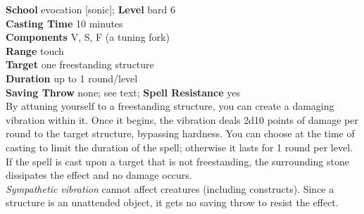 \textbf{School} evocation [sonic]; \textbf{Level} bard 6\\
\textbf{Casting Time} 10 minutes\\
\textbf{Components} V, S, F (a tuning fork)\\
\textbf{Range} touch\\
\textbf{Target} one freestanding structure\\
\textbf{Duration} up to 1 round/level\\
\textbf{Saving Throw} none; see text; \textbf{Spell Resistance} yes\\
By attuning yourself to a freestanding structure, you can create a damaging vibration within it. Once it begins, the vibration deals 2d10 points of damage per round to the target structure, bypassing hardness. You can choose at the time of casting to limit the duration of the spell; otherwise it lasts for 1 round per level. If the spell is cast upon a target that is not freestanding, the surrounding stone dissipates the effect and no damage occurs.\\
\textit{Sympathetic vibration }cannot affect creatures (including constructs). Since a structure is an unattended object, it gets no saving throw to resist the effect.\\
